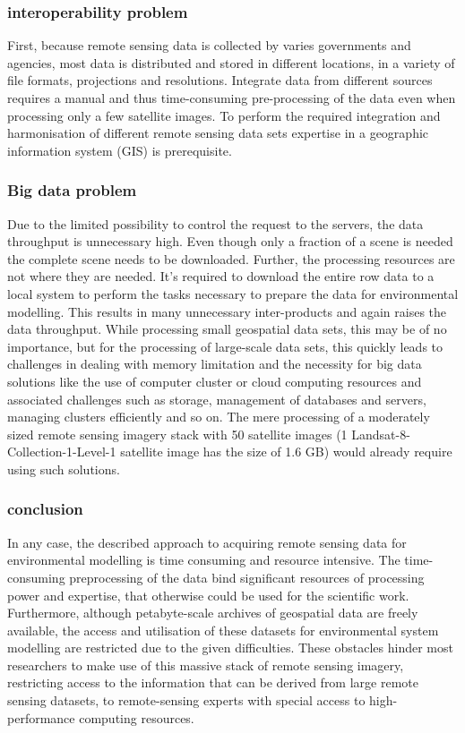 \documentclass[11pt,twoside,a4paper,final]{report}
\begin{document}
\subsubsection{interoperability problem}
First, because remote sensing data is collected by varies governments and agencies, most data is distributed and stored in different locations, in a variety of file formats, projections and resolutions. Integrate data from different sources requires a manual and thus time-consuming pre-processing of the data even when processing only a few satellite images. To perform the required integration and harmonisation of different remote sensing data sets expertise in a geographic information system (GIS) is prerequisite.

\subsubsection{Big data problem}
Due to the limited possibility to control the request to the servers, the data throughput is unnecessary high. Even though only a fraction of a scene is needed the complete scene needs to be downloaded. Further, the processing resources are not where they are needed. It's required to download the entire row data to a local system to perform the tasks necessary to prepare the data for environmental modelling. This results in many unnecessary inter-products and again raises the data throughput. While processing small geospatial data sets, this may be of no importance, but for the processing of large-scale data sets, this quickly leads to challenges in dealing with memory limitation and the necessity for big data solutions like the use of computer cluster or cloud computing resources and associated challenges such as storage, management of databases and servers, managing clusters efficiently and so on. 
The mere processing of a moderately sized remote sensing imagery stack with 50 satellite images (1 Landsat-8-Collection-1-Level-1 satellite image has the size of 1.6 GB) would already require using such solutions.


\subsubsection{conclusion}

In any case, the described approach to acquiring remote sensing data for environmental modelling is time consuming and resource intensive.
The time-consuming preprocessing of the data bind significant resources of processing power and expertise, that otherwise could be used for the scientific work. Furthermore, although petabyte-scale archives of geospatial data are freely available, the access and utilisation of these datasets for environmental system modelling are restricted due to the given difficulties. 
These obstacles hinder most researchers to make use of this massive stack of remote sensing imagery, restricting access to the information that can be derived from large remote sensing datasets, to remote-sensing experts with special access to high-performance computing resources.
\end{document}
